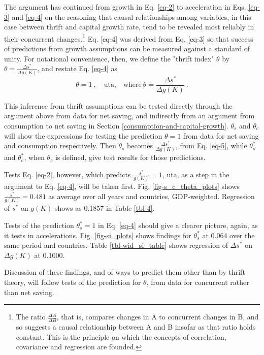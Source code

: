\documentclass[a4paper,fleqn]{latex_styles/cas-sc}
\begin{document}
The argument has continued from growth in Eq. \eqref{eq-2} to acceleration in Eqs. \eqref{eq-3} and \eqref{eq-4} on the reasoning that causal relationships among variables, in this case between thrift and capital growth rate, tend to be revealed most reliably in their concurrent changes.\footnote{The ratio \(\frac{\Delta A}{\Delta B}\), that is, compares changes in A to concurrent changes in B, and so suggests a causal relationship between A and B insofar as that ratio holds constant. This is the principle on which the concepts of correlation, covariance and regression are founded.} Eq. \eqref{eq-4} was derived from Eq. \eqref{eq-3} so that success of predictions from growth assumptions can be measured against a standard of unity. For notational convenience, then, we define the "thrift index" \(\theta\) by \(\theta = \frac{\Delta s^*}{\Delta g(K)}\), and restate Eq. \eqref{eq-4} as
%
\begin{equation}
\theta = 1\ , \quad \text{uta,}\quad \text{where} \ \theta = \frac{\Delta s^*}{\Delta g(K)}\ . \label{eq-5}
\end{equation}
%

This inference from thrift assumptions can be tested directly through the argument above from data for net saving, and indirectly from an argument from consumption to net saving in Section \ref{consumption-and-capital-growth}. \(\theta_s\) and \(\theta_c\) will show the expressions for testing the prediction \(\theta = 1\) from data for net saving and consumption respectively. Then \(\theta_s\) becomes \(\frac{\Delta s^*}{\Delta g(K)}\), from Eq. \eqref{eq-5}, while \(\theta^*_s\) and \(\theta^*_c\), when \(\theta_c\) is defined, give test results for those predictions.

Tests Eq. \eqref{eq-2}, however, which predicts \(\frac{s^*}{g(K)} = 1\), uta, as a step in the argument to Eq. \eqref{eq-4}, will be taken first. Fig. \ref{fig-s_c_theta_plots} shows \(\frac{s^*}{g(K)} = 0.481\) as average over all years and countries, GDP-weighted. Regression of \(s^*\) on \(g(K)\) shows as 0.1857 in Table \ref{tbl-4}.

Tests of the prediction \(\theta^*_s = 1\) in Eq. \eqref{eq-4} should give a clearer picture, again, as it tests in accelerations. Fig. \ref{fig-si_plots} shows findings for \(\theta^*_s\) at 0.064 over the same period and countries. Table \ref{tbl-wid_si_table} shows regression of \(\Delta s^*\) on \(\Delta g(K)\) at 0.1000.

Discussion of these findings, and of ways to predict them other than by thrift theory, will follow tests of the prediction for \(\theta\), from data for concurrent rather than net saving.
\end{document}
